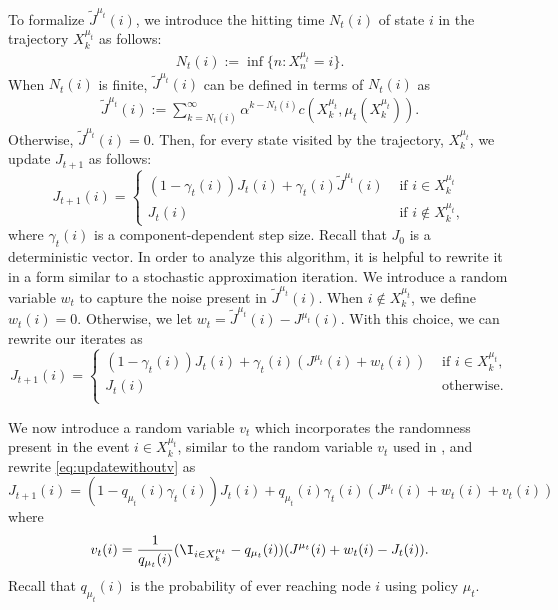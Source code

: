 \documentclass[12pt]{article}
\begin{document}
To formalize $\tilde{J}^{\mu_t}(i)$, we introduce the hitting time $N_t(i)$ of state $i$ in the trajectory $X_k^{\mu_t}$ as follows:
\begin{align*}
N_t(i) := \inf\{n: X_n^{\mu_t} = i\}.
\end{align*}
When $N_t(i)$ is finite, $\tilde{J}^{\mu_t}(i)$ can be defined in terms of $N_t(i)$ as
\begin{align*}
    \tilde{J}^{\mu_t}(i) := \sum_{k=N_t(i)}^\infty \alpha^{k-N_t(i)} c(X_k^{\mu_t}, \mu_t(X_k^{\mu_t})).
\end{align*} Otherwise, $\tilde{J}^{\mu_t}(i) = 0$. Then, for every state visited by the trajectory, $X_k^{\mu_t}$, we update $J_{t+1}$ as follows:
\begin{equation}
J_{t+1}(i) =  
	      \begin{cases}
               (1-\gamma_t(i))J_t(i) + \gamma_t(i)\tilde{J}^{\mu_t}(i) & \text{ if $i \in X_k^{\mu_t} $}\\
               J_t(i) & \text{ if $i \notin X_k^{\mu_t}$},
            \end{cases} \label{eq:update0}
\end{equation}
where $\gamma_t(i)$ is a component-dependent step size. Recall that $J_0$ is a deterministic vector. In order to analyze this algorithm, it is helpful to rewrite it in a form similar to a stochastic approximation iteration. We introduce a random variable $w_t$ to capture the noise present in $\tilde{J}^{\mu_t}(i)$. When $i \notin X^{\mu_t}_k$, we define $w_t(i)=0$. Otherwise, we let $w_t = \tilde{J}^{\mu_t}(i) - J^{\mu_t}(i)$. With this choice, we can rewrite our iterates as
\begin{equation}
J_{t+1}(i) =  
	      \begin{cases}
               (1-\gamma_t(i))J_t(i) + \gamma_t(i)(J^{\mu_t}(i) +  w_t(i))& \text{  if $i \in X_k^{\mu_t}$},\\
               J_t(i) & \text{ otherwise}.\\
            \end{cases} \label{eq:updatewithoutv}
\end{equation}

We now introduce a random variable $v_t$ which incorporates the randomness present in the event $i \in X_k^{\mu_t}$, similar to the random variable $v_t$ used in \cite{tsitsiklis2002convergence}, and rewrite \eqref{eq:updatewithoutv} as  
\begin{equation}
J_{t+1}(i) = (1-q_{\mu_t}(i)\gamma_t(i))J_t(i) + q_{\mu_t}(i)\gamma_t(i)(J^{\mu_t}(i) +  w_t(i) + v_t(i)) \label{eq:updatewithv}
\end{equation} where 
\begin{align*}
v_t(i) = \frac{1}{q_{\mu_t}(i)} (\I_{i \in X_k^{\mu_t}} - q_{\mu_t}(i) ) (J^{\mu_t}(i) +  w_t(i) - J_t(i) ).
\end{align*} 
Recall that $q_{\mu_t}(i)$ is the probability of ever reaching node $i$ using policy $\mu_t$. 
\end{document}
